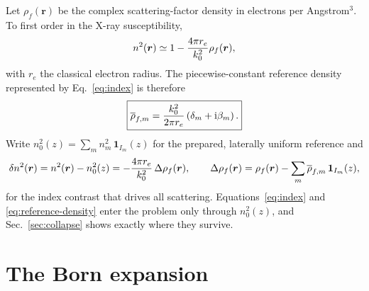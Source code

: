 Let $\rho_f(\bm r)$ be the complex scattering-factor density in electrons per
Angstrom$^3$.  To first order in the X-ray susceptibility,
\begin{equation}
  n^2(\bm r)\simeq
  1-\frac{4\pi r_e}{k_0^2}\rho_f(\bm r),
  \label{eq:index-density}
\end{equation}
with $r_e$ the classical electron radius.  The piecewise-constant reference
density represented by Eq.~\eqref{eq:index} is therefore
\begin{equation}
  \boxed{
  \overline\rho_{f,m}
  =\frac{k_0^2}{2\pi r_e}
   \left(\delta_m+\mathrm{i}\beta_m\right).
  }
  \label{eq:reference-density}
\end{equation}
Write $n_0^2(z)=\sum_m n_m^2\,\mathbf 1_{I_m}(z)$ for the prepared, laterally
uniform reference and
\begin{equation}
  \delta n^2(\bm r)=n^2(\bm r)-n_0^2(z)
  =-\frac{4\pi r_e}{k_0^2}\,\Delta\rho_f(\bm r),
  \qquad
  \Delta\rho_f(\bm r)
  =\rho_f(\bm r)-\sum_m\overline\rho_{f,m}\,\mathbf 1_{I_m}(z),
  \label{eq:density-contrast}
\end{equation}
for the index contrast that drives all scattering.  Equations~\eqref{eq:index}
and \eqref{eq:reference-density} enter the problem only through $n_0^2(z)$, and
Sec.~\ref{sec:collapse} shows exactly where they survive.

\section{The Born expansion}
\label{sec:born}

